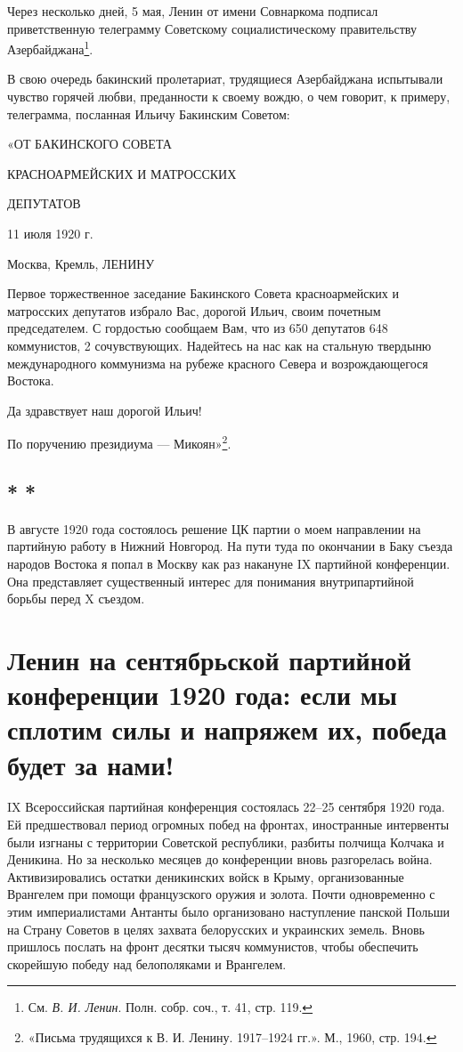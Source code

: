 \documentclass[12pt, a4paper, openany]{book}
\begin{document}
Через несколько дней, 5 мая, Ленин от имени Совнаркома подписал приветственную телеграмму Советскому социалистическому правительству Азербайджана\footnote{См. \textit{В. И. Ленин}. Полн. собр. соч., т. 41, стр. 119.}.

В свою очередь бакинский пролетариат, трудящиеся Азербайджана испытывали чувство горячей любви, преданности к своему вождю, о чем говорит, к примеру, телеграмма, посланная Ильичу Бакинским Советом:

«ОТ БАКИНСКОГО СОВЕТА

КРАСНОАРМЕЙСКИХ И МАТРОССКИХ

ДЕПУТАТОВ

11 июля 1920 г.

Москва, Кремль, ЛЕНИНУ

Первое торжественное заседание Бакинского Совета красноармейских и матросских депутатов избрало Вас, дорогой Ильич, своим почетным председателем. С гордостью сообщаем Вам, что из 650 депутатов 648 коммунистов, 2 сочувствующих. Надейтесь на нас как на стальную твердыню международного коммунизма на рубеже красного Севера и возрождающегося Востока.

Да здравствует наш дорогой Ильич!

По поручению президиума — Микоян»\footnote{«Письма трудящихся к В. И. Ленину. 1917–1924 гг.». М., 1960, стр. 194.}.

\subsection*{\center * * *}

В августе 1920 года состоялось решение ЦК партии о моем направлении на партийную работу в Нижний Новгород. На пути туда по окончании в Баку съезда народов Востока я попал в Москву как раз накануне IX партийной конференции. Она представляет существенный интерес для понимания внутрипартийной борьбы перед X съездом.

\newpage
\section[Ленин на сентябрьской партийной конференции 1920 года: если мы сплотим силы и напряжем их, победа будет за нами!]{\center \textbf{Ленин на сентябрьской партийной конференции 1920 года: если мы сплотим силы и напряжем их, победа будет за нами!}}


IX Всероссийская партийная конференция состоялась 22–25 сентября 1920 года. Ей предшествовал период огромных побед на фронтах, иностранные интервенты были изгнаны с территории Советской республики, разбиты полчища Колчака и Деникина. Но за несколько месяцев до конференции вновь разгорелась война. Активизировались остатки деникинских войск в Крыму, организованные Врангелем при помощи французского оружия и золота. Почти одновременно с этим империалистами Антанты было организовано наступление панской Польши на Страну Советов в целях захвата белорусских и украинских земель. Вновь пришлось послать на фронт десятки тысяч коммунистов, чтобы обеспечить скорейшую победу над белополяками и Врангелем.
\end{document}
